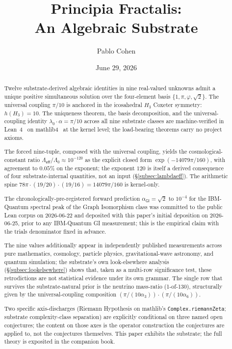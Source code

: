 \documentclass[11pt,a4paper]{amsart}
\title{Principia Fractalis:\\ An Algebraic Substrate}
\author{Pablo Cohen}
\date{June 29, 2026}
\theoremstyle{plain}
\theoremstyle{definition}
\begin{document}
\maketitle

\begin{abstract}
Twelve substrate-derived algebraic identities in nine real-valued unknowns admit a unique positive simultaneous solution over the four-element basis $\{1,\pi,\varphi,\sqrt{2}\}$. The universal coupling $\pi/10$ is anchored in the icosahedral $H_3$ Coxeter symmetry: $h(H_3) = 10$. The uniqueness theorem, the basis decomposition, and the universal-coupling identity $\lambda_0 \cdot \alpha = \pi/10$ across all nine substrate classes are machine-verified in Lean~4~\cite{moura-ullrich2021} on mathlib4~\cite{mathlib4} at the kernel level; the load-bearing theorems carry no project axioms.

The forced nine-tuple, composed with the universal coupling, yields the cosmological-constant ratio $\Lambda_{\textsf{eff}}/\Lambda_0 \approx 10^{-120}$ as the explicit closed form $\exp(-14079\pi/160)$, with agreement to $0.05\%$ on the exponent; the exponent $120$ is itself a derived consequence of four substrate-internal quantities, not an input (\S\ref{subsec:lambdaeff}). The arithmetic spine $78\pi \cdot (19/20) \cdot (19/16) = 14079\pi/160$ is kernel-only.

The chronologically-pre-registered forward prediction $\alpha_{\textsf{GI}} = \sqrt{2}$ to $10^{-4}$ for the IBM-Quantum spectral peak of the Graph Isomorphism class was committed to the public Lean corpus on 2026-06-22 and deposited with this paper's initial deposition on 2026-06-25, prior to any IBM-Quantum GI measurement; this is the empirical claim with the trials denominator fixed in advance.

The nine values additionally appear in independently published measurements across pure mathematics, cosmology, particle physics, gravitational-wave astronomy, and quantum simulation; the substrate's own look-elsewhere analysis (\S\ref{subsec:lookelsewhere}) shows that, taken as a multi-row significance test, these retrodictions are not statistical evidence under its own grammar. The single row that survives the substrate-natural prior is the neutrino mass-ratio (1-of-130), structurally given by the universal-coupling composition $(\pi/(10\alpha_3))\cdot(\pi/(10\alpha_6))$.

Two specific axis-discharges (Riemann Hypothesis on mathlib's \texttt{Complex.riemannZeta}; substrate complexity-class separation) are explicitly conditional on three named open conjectures; the content on those axes is the operator construction the conjectures are applied to, not the conjectures themselves. This paper exhibits the substrate; the full theory is exposited in the companion book.
\end{abstract}
\end{document}
